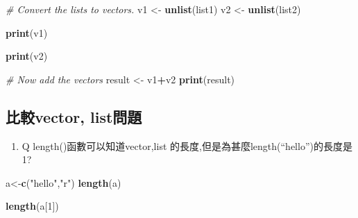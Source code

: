 \documentclass[]{book}
\newenvironment{Shaded}{\begin{snugshade}}{\end{snugshade}}
\newcommand{\CommentTok}[1]{\textcolor[rgb]{0.56,0.35,0.01}{\textit{#1}}}
\newcommand{\DecValTok}[1]{\textcolor[rgb]{0.00,0.00,0.81}{#1}}
\newcommand{\KeywordTok}[1]{\textcolor[rgb]{0.13,0.29,0.53}{\textbf{#1}}}
\newcommand{\NormalTok}[1]{#1}
\newcommand{\OperatorTok}[1]{\textcolor[rgb]{0.81,0.36,0.00}{\textbf{#1}}}
\newcommand{\StringTok}[1]{\textcolor[rgb]{0.31,0.60,0.02}{#1}}
\providecommand{\tightlist}{%
  \setlength{\itemsep}{0pt}\setlength{\parskip}{0pt}}
\theoremstyle{definition}
\theoremstyle{definition}
\theoremstyle{definition}
\theoremstyle{remark}
\begin{document}
\begin{Shaded}
\begin{Highlighting}[]
\CommentTok{# Convert the lists to vectors.}
\NormalTok{v1 <-}\StringTok{ }\KeywordTok{unlist}\NormalTok{(list1)}
\NormalTok{v2 <-}\StringTok{ }\KeywordTok{unlist}\NormalTok{(list2)}

\KeywordTok{print}\NormalTok{(v1)}
\end{Highlighting}
\end{Shaded}

\begin{Shaded}
\begin{Highlighting}[]
\KeywordTok{print}\NormalTok{(v2)}
\end{Highlighting}
\end{Shaded}

\begin{Shaded}
\begin{Highlighting}[]
\CommentTok{# Now add the vectors}
\NormalTok{result <-}\StringTok{ }\NormalTok{v1}\OperatorTok{+}\NormalTok{v2}
\KeywordTok{print}\NormalTok{(result)}
\end{Highlighting}
\end{Shaded}

\hypertarget{vector-list}{%
\subsection{比較vector, list問題}\label{vector-list}}

\begin{enumerate}
\def\labelenumi{\arabic{enumi}.}
\tightlist
\item
  Q length()函數可以知道vector,list
  的長度,但是為甚麼length(``hello'')的長度是1?
\end{enumerate}

\begin{Shaded}
\begin{Highlighting}[]
\NormalTok{a<-}\KeywordTok{c}\NormalTok{(}\StringTok{"hello"}\NormalTok{,}\StringTok{"r"}\NormalTok{)}
\KeywordTok{length}\NormalTok{(a)}
\end{Highlighting}
\end{Shaded}

\begin{Shaded}
\begin{Highlighting}[]
\KeywordTok{length}\NormalTok{(a[}\DecValTok{1}\NormalTok{])}
\end{Highlighting}
\end{Shaded}
\end{document}
